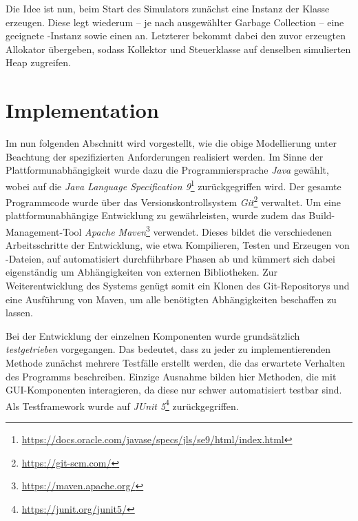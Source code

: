 Die Idee ist nun, beim Start des Simulators zunächst eine Instanz der Klasse  erzeugen.
Diese legt wiederum -- je nach ausgewählter Garbage Collection -- eine geeignete -Instanz sowie einen  an.
Letzterer bekommt dabei den zuvor erzeugten Allokator übergeben, sodass Kollektor und Steuerklasse auf denselben simulierten Heap zugreifen.

\section{Implementation}
\label{sec:implementation}
Im nun folgenden Abschnitt wird vorgestellt, wie die obige Modellierung unter Beachtung der spezifizierten Anforderungen realisiert werden.
Im Sinne der Plattformunabhängigkeit wurde dazu die Programmiersprache \textit{Java} gewählt, wobei auf die \textit{Java Language Specification 9}\footnote{\url{https://docs.oracle.com/javase/specs/jls/se9/html/index.html}} zurückgegriffen wird.
Der gesamte Programmcode wurde über das Versionskontrollsystem \textit{Git}\footnote{\url{https://git-scm.com/}} verwaltet.
Um eine plattformunabhängige Entwicklung zu gewährleisten, wurde zudem das Build-Management-Tool \textit{Apache Maven}\footnote{\url{https://maven.apache.org/}} verwendet.
Dieses bildet die verschiedenen Arbeitsschritte der Entwicklung, wie etwa Kompilieren, Testen und Erzeugen von -Dateien, auf automatisiert durchführbare Phasen ab und kümmert sich dabei eigenständig um Abhängigkeiten von externen Bibliotheken.
Zur Weiterentwicklung des Systems genügt somit ein Klonen des Git-Repositorys und eine Ausführung von Maven, um alle benötigten Abhängigkeiten beschaffen zu lassen.

Bei der Entwicklung der einzelnen Komponenten wurde grundsätzlich \textit{testgetrieben} vorgegangen.
Das bedeutet, dass zu jeder zu implementierenden Methode zunächst mehrere Testfälle erstellt werden, die das erwartete Verhalten des Programms beschreiben.
Einzige Ausnahme bilden hier Methoden, die mit GUI-Komponenten interagieren, da diese nur schwer automatisiert testbar sind.
Als Testframework wurde auf \textit{JUnit 5}\footnote{\url{https://junit.org/junit5/}} zurückgegriffen.

\newpage

